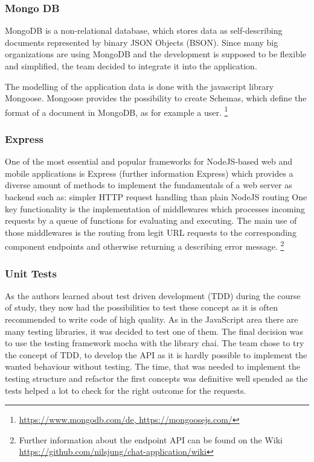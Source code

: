 \subsubsection{Mongo DB}
MongoDB is a non-relational database, which stores data as self-describing documents represented by binary JSON Objects (BSON). 
Since many big organizations are using MongoDB and the development is supposed to be flexible and simplified, the team decided to integrate it into the application.

The modelling of the application data is done with the javascript library Mongoose.
Mongoose provides the possibility to create Schemas, which define the format of a document in MongoDB, as for example a user.
\footnote{\url{https://www.mongodb.com/de, https://mongoosejs.com/}}

\subsubsection{Express}
One of the most essential and popular frameworks for NodeJS-based web and mobile applications is Express (further information Express) which provides a diverse amount of methods to implement the fundamentals of a web server as backend such as:
simpler HTTP request handling than plain NodeJS
routing
One key functionality is the implementation of middlewares which processes incoming requests by a queue of functions for evaluating and executing. The main use of those middlewares is the routing from legit URL requests to the corresponding component endpoints and otherwise returning a describing error message.
\footnote{Further information about the endpoint API can be found on the Wiki \url{https://github.com/nilsjung/chat-application/wiki}}
\subsubsection{Unit Tests}
As the authors learned about test driven development (TDD) during the course of study, they now had the possibilities to test these concept as it is often recommended to write code of high quality. As in the JavaScript area there are many testing libraries, it was decided to test one of them. The final decision was to use the testing framework mocha with the library chai.
The team chose to try the concept of TDD, to develop the API as it is hardly possible to implement the wanted behaviour without testing. The time, that was needed to implement the testing structure and refactor the first concepts was definitive well spended as the tests helped a lot to check for the right outcome for the requests.

